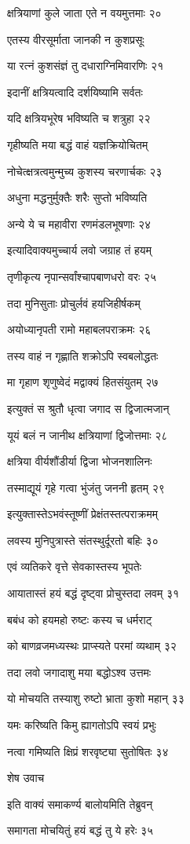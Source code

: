 क्षत्रियाणां कुले जाता एते न वयमुत्तमाः २०

एतस्य वीरसूर्माता जानकी न कुशप्रसूः

या रत्नं कुशसंज्ञं तु दधाराग्निमिवारणिः २१

इदानीं क्षत्रियत्वादि दर्शयिष्यामि सर्वतः

यदि क्षत्रियभूरेष भविष्यति च शत्रुहा २२

गृहीष्यति मया बद्धं वाहं यज्ञक्रियोचितम्

नोचेत्क्षत्रत्वमुन्मुच्य कुशस्य चरणार्चकः २३

अधुना मद्धनुर्मुक्तैः शरैः सुप्तो भविष्यति

अन्ये ये च महावीरा रणमंडलभूषणाः २४

इत्यादिवाक्यमुच्चार्य लवो जग्राह तं हयम्

तृणीकृत्य नृपान्सर्वांश्चापबाणधरो वरः २५

तदा मुनिसुताः प्रोचुर्लवं हयजिहीर्षकम्

अयोध्यानृपती रामो महाबलपराक्रमः २६

तस्य वाहं न गृह्णाति शक्रोऽपि स्वबलोद्धतः

मा गृहाण शृणुष्वेदं मद्वाक्यं हितसंयुतम् २७

इत्युक्तं स श्रुतौ धृत्वा जगाद स द्विजात्मजान्

यूयं बलं न जानीथ क्षत्रियाणां द्विजोत्तमाः २८

क्षत्रिया वीर्यशौंडीर्या द्विजा भोजनशालिनः

तस्माद्यूयं गृहे गत्वा भुंजंतु जननी हृतम् २९

इत्युक्तास्तेऽभवंस्तूष्णीं प्रेक्षंतस्तत्पराक्रमम्

लवस्य मुनिपुत्रास्ते संतस्थुर्दूरतो बहिः ३०

एवं व्यतिकरे वृत्ते सेवकास्तस्य भूपतेः

आयातास्तं हयं बद्धं दृष्ट्वा प्रोचुस्तदा लवम् ३१

बबंध को हयमहो रुष्टः कस्य च धर्मराट्

को बाणव्रजमध्यस्थः प्राप्स्यते परमां व्यथाम् ३२

तदा लवो जगादाशु मया बद्धोऽश्व उत्तमः

यो मोचयति तस्याशु रुष्टो भ्राता कुशो महान् ३३

यमः करिष्यति किमु ह्यागतोऽपि स्वयं प्रभुः

नत्वा गमिष्यति क्षिप्रं शरवृष्ट्या सुतोषितः ३४

शेष उवाच

इति वाक्यं समाकर्ण्य बालोयमिति तेब्रुवन्

समागता मोचयितुं हयं बद्धं तु ये हरेः ३५

